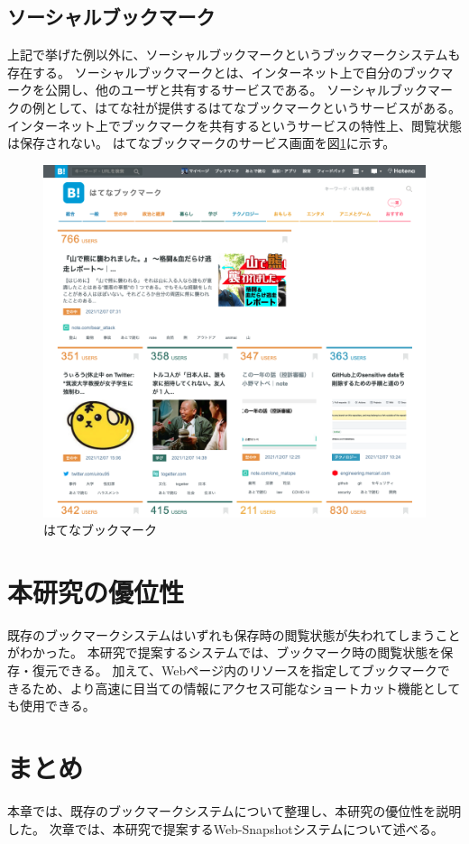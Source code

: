 \subsection{ソーシャルブックマーク}
上記で挙げた例以外に、ソーシャルブックマークというブックマークシステムも存在する。
ソーシャルブックマークとは、インターネット上で自分のブックマークを公開し、他のユーザと共有するサービスである。
ソーシャルブックマークの例として、はてな社\cite{hatena}が提供するはてなブックマーク\cite{hatena-bookmark}というサービスがある。
インターネット上でブックマークを共有するというサービスの特性上、閲覧状態は保存されない。
はてなブックマークのサービス画面を図\ref{fig:hatena-bookmark}に示す。

\begin{figure}[htbp]
  \caption{はてなブックマーク}
  \label{fig:hatena-bookmark}
  \begin{center}
    \includegraphics[bb=0 0 1020 940,width=15cm]{img/020_related_works/hatena-bookmark.pdf}
  \end{center}
\end{figure}

\section{本研究の優位性}
既存のブックマークシステムはいずれも保存時の閲覧状態が失われてしまうことがわかった。
本研究で提案するシステムでは、ブックマーク時の閲覧状態を保存・復元できる。
加えて、Webページ内のリソースを指定してブックマークできるため、より高速に目当ての情報にアクセス可能なショートカット機能としても使用できる。

\section{まとめ}
本章では、既存のブックマークシステムについて整理し、本研究の優位性を説明した。
次章では、本研究で提案するWeb-Snapshotシステムについて述べる。